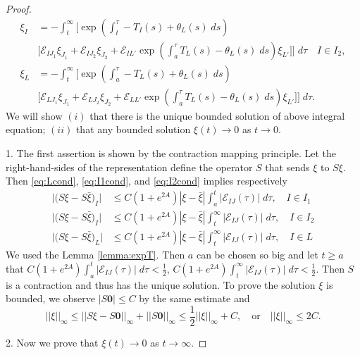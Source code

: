 \documentclass[a4paper,11pt]{article}
\theoremstyle{remark}
\begin{document}
\begin{proof}
\begin{align}
 \xi_I &= -\int_t^\infty \bigg[ \exp\left(\int_t^\tau -T_I(s)+\theta_L(s)\; ds\right) \nonumber \\
 &\Big[\mathcal{E}_{I{J_1}}\xi_{J_1} + \mathcal{E}_{I{J_2}}\xi_{J_2} + \mathcal{E}_{IL'}\exp\left(\int_a^\tau T_L(s)-\theta_L(s)\; ds\right) \xi_{L'}\Big] \bigg] \;d\tau \quad I \in I_2, \label{eq:reprI2}\\
 \xi_L &= -\int_t^\infty \bigg[ \exp\left(\int_a^\tau -T_L(s)+\theta_L(s)\; ds\right) \nonumber\\
 &\Big[\mathcal{E}_{L{J_1}}\xi_{J_1} + \mathcal{E}_{L{J_2}}\xi_{J_2} + \mathcal{E}_{LL'}\exp\left(\int_a^\tau T_L(s)-\theta_L(s)\; ds\right) \xi_{L'}\Big] \bigg] \;d\tau. \label{eq:reprL}
\end{align}
We will show $(i)$ that there is the unique bounded solution of above integral equation; $(ii)$ that any bounded solution $\xi(t) \rightarrow 0$ as $t \rightarrow 0$.

1. The first assertion is shown by the contraction mapping principle. Let the right-hand-sides of the representation define the operator $S$ that sends $\xi$ to $S\xi$. Then \eqref{eq:Lcond}, \eqref{eq:I1cond}, and \eqref{eq:I2cond} implies respectively
\begin{align*}
 \Big|\big(S\xi - S\bar\xi\big)_I\Big| &\le C(1+e^{2A})|\xi - \bar\xi| \int_a^t |\mathcal{E}_{IJ}(\tau)| \; d\tau, \quad I\in I_1\\
\Big|\big(S\xi - S\bar\xi\big)_I\Big| &\le C(1+e^{2A})|\xi - \bar\xi| \int_t^\infty |\mathcal{E}_{IJ}(\tau)| \; d\tau, \quad I\in I_2\\
\Big|\big(S\xi - S\bar\xi\big)_L\Big| &\le C(1+e^{2A})|\xi - \bar\xi| \int_t^\infty |\mathcal{E}_{IJ}(\tau)| \; d\tau, \quad I\in L
\end{align*}
We used the Lemma \ref{lemma:expT}. Then $a$ can be chosen so big and let $t\ge a$ that $C(1+e^{2A})\int_a^t |\mathcal{E}_{IJ}(\tau)| \; d\tau < \frac{1}{2}$, $C(1+e^{2A})\int_t^\infty |\mathcal{E}_{IJ}(\tau)| \; d\tau < \frac{1}{2}$. Then $S$ is a contraction and thus has the unique solution. To prove the solution $\xi$ is bounded, we observe $|S\mathbf{0}| \le C$ by the same estimate and
$$ ||\xi||_\infty \le ||S\xi - S\mathbf{0}||_\infty + ||S\mathbf{0}||_\infty \le \frac{1}{2} ||\xi||_\infty + C, \quad \text{or} \quad ||\xi||_\infty \le 2C.$$

2. Now we prove that $\xi(t) \rightarrow 0$ as $t \rightarrow \infty$.
\end{proof}
\end{document}
